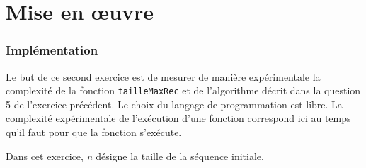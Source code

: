\documentclass[12pt,a4paper]{article}
\begin{document}
\lstset{escapechar=@,style=custompy}
\newpage
\part{Mise en \oe uvre}

\section{Impl\'ementation}
Le but de ce second exercice est de mesurer de mani\`ere exp\'erimentale la complexit\'e de la fonction \texttt{tailleMaxRec} et de l'algorithme d\'ecrit dans la question 5 de l'exercice pr\'ec\'edent. Le choix du langage de programmation est libre. La complexit\'e exp\'erimentale de l'ex\'ecution d'une fonction correspond ici au temps qu'il faut pour que la fonction s'ex\'ecute.

Dans cet exercice, {\itshape n} d\'esigne la taille de la s\'equence initiale.
\end{document}
